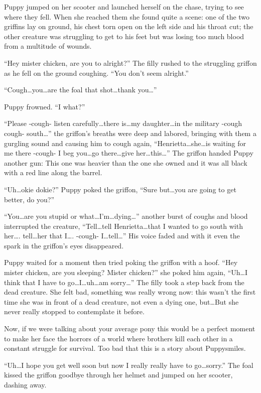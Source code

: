 Puppy jumped on her scooter and launched herself on the chase, trying to see where they fell. When she reached them she found quite a scene: one of the two griffins lay on ground, his chest torn open on the left side and his throat cut; the other creature was struggling to get to his feet but was losing too much blood from a multitude of wounds.

``Hey mister chicken, are you to alright?'' The filly rushed to the struggling griffon as he fell on the ground coughing. ``You don't seem alright.''

``Cough\dots you\dots are the foal that shot\dots thank you\dots''

Puppy frowned. ``I what?''

``Please -cough- listen carefully\dots there is\dots my daughter\dots in the military -cough cough- south\dots'' the griffon's breaths were deep and labored, bringing with them a gurgling sound and causing him to cough again, ``Henrietta\dots she\dots is waiting for me there -cough- I beg you\dots go there\dots give her\dots this\dots'' The griffon handed Puppy another gun: This one was heavier than the one she owned and it was all black with a red line along the barrel.

``Uh\dots okie dokie?'' Puppy poked the griffon, ``Sure but\dots you are going to get better, do you?''

``You\dots are you stupid or what\dots I'm\dots dying\dots'' another burst of coughs and blood interrupted the creature, ``Tell\dots tell Henrietta\dots that I wanted to go south with her\dots. tell\dots her that I\dots. -cough- I\dots tell\dots'' His voice faded and with it even the spark in the griffon's eyes disappeared.

Puppy waited for a moment then tried poking the griffon with a hoof. ``Hey mister chicken, are you sleeping? Mister chicken?'' she poked him again, ``Uh\dots I think that I have to go\dots I\dots uh\dots am sorry\dots'' The filly took a step back from the dead creature. She felt bad, something was really wrong now: this wasn't the first time she was in front of a dead creature, not even a dying one, but\dots But she never really stopped to contemplate it before.

Now, if we were talking about your average pony this would be a perfect moment to make her face the horrors of a world where brothers kill each other in a constant struggle for survival. Too bad that this is a story about Puppysmiles.

``Uh\dots I hope you get well soon but now I really really have to go\dots sorry.'' The foal kissed the griffon goodbye through her helmet and jumped on her scooter, dashing away.

